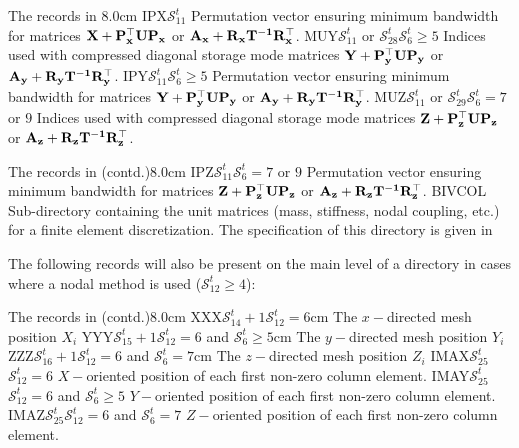 \begin{DescriptionEnregistrement}{The  records in
}{8.0cm}
  {IPX}{$\mathcal{S}^{t}_{11}$}
  {Permutation vector ensuring minimum bandwidth for matrices $\bf{X}+\bf{P}_x^\top \bf{U}\bf{P}_x$ or $\bf{A}_x+\bf{R}_x\bf{T}^{-1}\bf{R}_x^\top$.} 
\OptIntEnr
  {MUY}{$\mathcal{S}^{t}_{11}$ or $\mathcal{S}^{t}_{28}$}{$\mathcal{S}^{t}_{6}\ge 5$}
  {Indices used with compressed diagonal storage mode matrices $\bf{Y}+\bf{P}_y^\top \bf{U}\bf{P}_y$ or $\bf{A}_y+\bf{R}_y\bf{T}^{-1}\bf{R}_y^\top$.} 
\OptIntEnr
  {IPY}{$\mathcal{S}^{t}_{11}$}{$\mathcal{S}^{t}_{6}\ge 5$}
  {Permutation vector ensuring minimum bandwidth for matrices $\bf{Y}+\bf{P}_y^\top \bf{U}\bf{P}_y$ or $\bf{A}_y+\bf{R}_y\bf{T}^{-1}\bf{R}_y^\top$.} 
\OptIntEnr
  {MUZ}{$\mathcal{S}^{t}_{11}$ or $\mathcal{S}^{t}_{29}$}{$\mathcal{S}^{t}_{6}=7$ or $9$}
  {Indices used with compressed diagonal storage mode matrices $\bf{Z}+\bf{P}_z^\top \bf{U}\bf{P}_z$ or $\bf{A}_z+\bf{R}_z\bf{T}^{-1}\bf{R}_z^\top$.} 
\end{DescriptionEnregistrement}

\begin{DescriptionEnregistrement}{The  records in  (contd.)}{8.0cm}
\OptIntEnr
  {IPZ}{$\mathcal{S}^{t}_{11}$}{$\mathcal{S}^{t}_{6}=7$ or $9$}
  {Permutation vector ensuring minimum bandwidth for matrices $\bf{Z}+\bf{P}_z^\top \bf{U}\bf{P}_z$ or $\bf{A}_z+\bf{R}_z\bf{T}^{-1}\bf{R}_z^\top$.} 
\DirEnr
  {BIVCOL}
  {Sub-directory containing the unit matrices (mass, stiffness, nodal coupling,
   etc.) for a finite element discretization.
  The specification of this directory is given in }
\end{DescriptionEnregistrement}

The following records will also be present on the main level of a 
directory in cases where a nodal method is used ($\mathcal{S}^{t}_{12}\ge 4$):

\begin{DescriptionEnregistrement}{The  records in  (contd.)}{8.0cm}
\OptRealEnr
  {XXX}{$\mathcal{S}^{t}_{14}+1$}{$\mathcal{S}^{t}_{12}=6$}{cm}
  {The $x-$directed mesh position $X_{i}$}
\OptRealEnr
  {YYY}{$\mathcal{S}^{t}_{15}+1$}{$\mathcal{S}^{t}_{12}=6$ and $\mathcal{S}^{t}_{6}\ge 5$}{cm}
  {The $y-$directed mesh position $Y_{i}$}
\OptRealEnr
  {ZZZ}{$\mathcal{S}^{t}_{16}+1$}{$\mathcal{S}^{t}_{12}=6$ and $\mathcal{S}^{t}_{6}=7$}{cm}
  {The $z-$directed mesh position $Z_{i}$}
\OptIntEnr
  {IMAX}{$\mathcal{S}^{t}_{25}$}{$\mathcal{S}^{t}_{12}=6$}
  {$X-$oriented position of each first non-zero column element.} 
\OptIntEnr
  {IMAY}{$\mathcal{S}^{t}_{25}$}{$\mathcal{S}^{t}_{12}=6$ and $\mathcal{S}^{t}_{6}\ge 5$}
  {$Y-$oriented position of each first non-zero column element.} 
\OptIntEnr
  {IMAZ}{$\mathcal{S}^{t}_{25}$}{$\mathcal{S}^{t}_{12}=6$ and $\mathcal{S}^{t}_{6}=7$}
  {$Z-$oriented position of each first non-zero column element.} 
\end{DescriptionEnregistrement}

